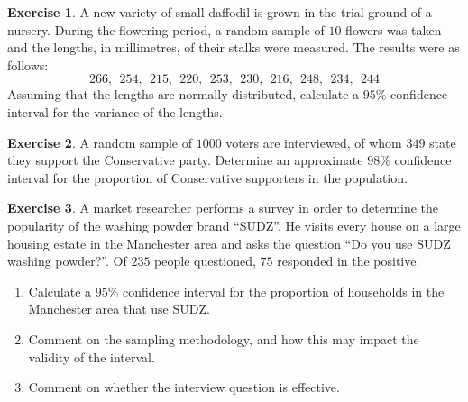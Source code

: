 \documentclass[
]{book}
\theoremstyle{definition}
\theoremstyle{definition}
\theoremstyle{definition}
\newtheorem{exercise}{Exercise}[chapter]
\theoremstyle{definition}
\theoremstyle{remark}
\begin{document}
\begin{exercise}
A new variety of small daffodil is grown in the trial ground of a nursery. During the flowering period, a random sample of \(10\) flowers was taken and the lengths, in millimetres, of their stalks were measured. The results were as follows:
\[266, \ \ 254, \ \  215, \ \  220, \ \  253, \ \  230, \ \  216, \ \  248,  \ \ 234, \ \  244\]
Assuming that the lengths are normally distributed, calculate a \(95\%\) confidence interval for the variance of the lengths.
\end{exercise}

\begin{exercise}
A random sample of \(1000\) voters are interviewed, of whom \(349\) state they support the Conservative party. Determine an approximate \(98\%\) confidence interval for the proportion of Conservative supporters in the population.
\end{exercise}

\begin{exercise}

A market researcher performs a survey in order to determine the popularity of the washing powder brand ``SUDZ''. He visits every house on a large housing estate in the Manchester area and asks the question ``Do you use SUDZ washing powder?''. Of \(235\) people questioned, \(75\) responded in the positive.

\begin{enumerate}
\def\labelenumi{\alph{enumi})}
\item
  Calculate a \(95\%\) confidence interval for the proportion of households in the Manchester area that use SUDZ.
\item
  Comment on the sampling methodology, and how this may impact the validity of the interval.
\item
  Comment on whether the interview question is effective.
\end{enumerate}

\end{exercise}
\end{document}
